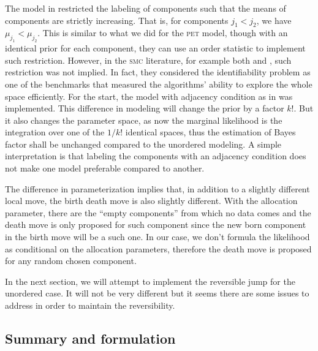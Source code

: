 \documentclass[11pt, linespread = 1.1, lines=40, lineratio = 30, bib,
fontset = Minion]{marticle}
\def\pet{\textsc{pet}\xspace}
\def\smc{\textsc{smc}\xspace}
\begin{document}
  The model in \textcite{Richardson:1997ea} restricted the labeling of
  components such that the means of components are strictly increasing. That
  is, for components $j_1 < j_2$, we have $\mu_{j_1} < \mu_{j_2}$. This is
  similar to what we did for the \pet model, though with an identical prior
  for each component, they can use an order statistic to implement such
  restriction. However, in the \smc literature, for example both
  \textcite{DelMoral:2006hc} and \textcite{Jasra:2007in}, such restriction was
  not implied. In fact, they considered the identifiability problem as one of
  the benchmarks that measured the algorithms' ability to explore the whole
  space efficiently. For the start, the model with adjacency condition as in
  \textcite{Richardson:1997ea} was implemented. This difference in modeling
  will change the prior by a factor $k!$. But it also changes the parameter
  space, as now the marginal likelihood is the integration over one of the
  $1/k!$ identical spaces, thus the estimation of Bayes factor shall be
  unchanged compared to the unordered modeling. A simple interpretation is
  that labeling the components with an adjacency condition does not make one
  model preferable compared to another.

  The difference in parameterization implies that, in addition to a slightly
  different local move, the birth death move is also slightly different. With
  the allocation parameter, there are the ``empty components'' from which no
  data comes and the death move is only proposed for such component since the
  new born component in the birth move will be a such one. In our case, we
  don't formula the likelihood as conditional on the allocation parameters,
  therefore the death move is proposed for any random chosen component.

  In the next section, we will attempt to implement the reversible jump for
  the unordered case. It will not be very different but it seems there are
  some issues to address in order to maintain the reversibility.

  \subsection{Summary and formulation}
\end{document}
